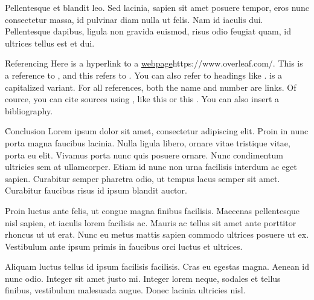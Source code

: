 \documentclass{ieee_modern}
\begin{document}


Pellentesque et blandit leo. Sed lacinia, sapien sit amet posuere tempor, eros nunc consectetur massa, id pulvinar diam nulla ut felis. Nam id iaculis dui. Pellentesque dapibus, ligula non gravida euismod, risus odio feugiat quam, id ultrices tellus est et dui.

\h{Referencing}
Here is a hyperlink to a \url{webpage}{https://www.overleaf.com/}. This is a reference to , and this refers to . You can also refer to headings like .  is a capitalized variant. For all references, both the name and number are links. Of cource, you can cite sources using \c{\cite{...}}, like this \cite{minted} or this \cite{tabularray}. You can also insert a bibliography.

\h{Conclusion}
Lorem ipsum dolor sit amet, consectetur adipiscing elit. Proin in nunc porta magna faucibus lacinia. Nulla ligula libero, ornare vitae tristique vitae, porta eu elit. Vivamus porta nunc quis posuere ornare. Nunc condimentum ultricies sem at ullamcorper. Etiam id nunc non urna facilisis interdum ac eget sapien. Curabitur semper pharetra odio, ut tempus lacus semper sit amet. Curabitur faucibus risus id ipsum blandit auctor.

Proin luctus ante felis, ut congue magna finibus facilisis. Maecenas pellentesque nisl sapien, et iaculis lorem facilisis ac. Mauris ac tellus sit amet ante porttitor rhoncus ut ut erat. Nunc eu metus mattis sapien commodo ultrices posuere ut ex. Vestibulum ante ipsum primis in faucibus orci luctus et ultrices.

Aliquam luctus tellus id ipsum facilisis facilisis. Cras eu egestas magna. Aenean id nunc odio. Integer sit amet justo mi. Integer lorem neque, sodales et tellus finibus, vestibulum malesuada augue. Donec lacinia ultricies nisl.

\toc

\end{document}
